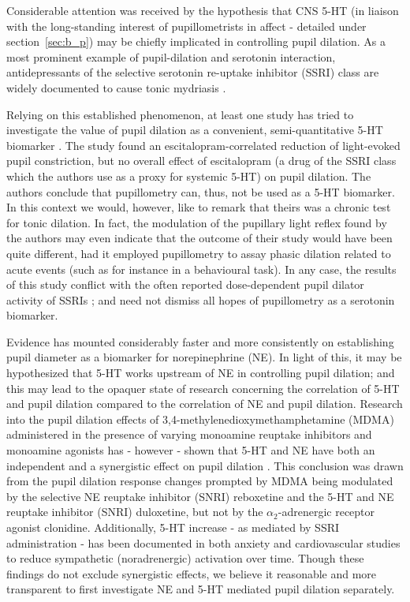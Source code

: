 	Considerable attention was received by the hypothesis that CNS 5-HT (in liaison with the long-standing interest of pupillometrists in affect - detailed under section~\ref{sec:b_p}) may be chiefly implicated in controlling pupil dilation.
	As a most prominent example of pupil-dilation and serotonin interaction, antidepressants of the selective serotonin re-uptake inhibitor (SSRI) class are widely documented to cause tonic mydriasis \citep{Fitzgerald2013,Klein-Schwartz2012}.
	
	Relying on this established phenomenon, at least one study has tried to investigate the value of pupil dilation as a convenient, semi-quantitative 5-HT biomarker \citep{Noehr-Jensen2009}.
	The study found an escitalopram-correlated reduction of light-evoked pupil constriction, but no overall effect of escitalopram (a drug of the SSRI class which the authors use as a proxy for systemic 5-HT) on pupil dilation.
	The authors conclude that pupillometry can, thus, not be used as a 5-HT biomarker.
	In this context we would, however, like to remark that theirs was a chronic test for tonic dilation.
	In fact, the modulation of the pupillary light reflex found by the authors may even indicate that the outcome of their study would have been quite different, had it employed pupillometry to assay phasic dilation related to acute events (such as for instance in a behavioural task).
	In any case, the results of this study conflict with the often reported dose-dependent pupil dilator activity of SSRIs \citep{Nielsen2010,Fitzgerald2013,Klein-Schwartz2012};
	and need not dismiss all hopes of pupillometry as a serotonin biomarker.
	
	Evidence has mounted considerably faster and more consistently on establishing pupil diameter as a biomarker for norepinephrine (NE).
	In light of this, it may be hypothesized that 5-HT works upstream of NE in controlling pupil dilation; and this may lead to the opaquer state of research concerning the correlation of 5-HT and pupil dilation compared to the correlation of NE and pupil dilation.
	Research into the pupil dilation effects of 3,4-methylenedioxymethamphetamine (MDMA) administered in the presence of varying monoamine reuptake inhibitors and monoamine agonists has - however - shown that 5-HT and NE have both an independent and a synergistic effect on pupil dilation \citep{Hysek2012}.
	This conclusion was drawn from the pupil dilation response changes prompted by MDMA being modulated by the selective NE reuptake inhibitor (SNRI) reboxetine and the 5-HT and NE reuptake inhibitor (SNRI) duloxetine, but not by the $\alpha_2$-adrenergic receptor agonist clonidine.
	Additionally, 5-HT increase - as mediated by SSRI administration - has been documented in both anxiety \citep{Blier2007} and cardiovascular \citep{Barton2007} studies to reduce sympathetic (noradrenergic) activation over time. 
	Though these findings do not exclude synergistic effects, we believe it reasonable and more transparent to first investigate NE and 5-HT mediated pupil dilation separately.
	
